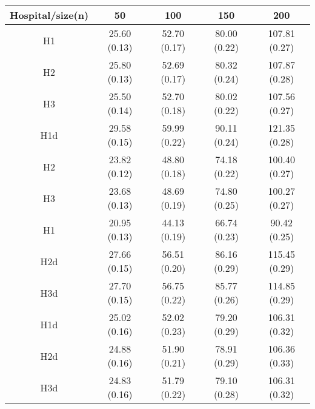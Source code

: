 \begin{center}
\begin{tabular}{c | c | c | c | c}
Hospital/size(n) & 50 & 100 & 150 & 200\\ \hline
H1 & 25.60 (0.13) & 52.70 (0.17) & 80.00 (0.22) & 107.81 (0.27) \\
H2 & 25.80 (0.13) & 52.69 (0.17) & 80.32 (0.24) & 107.87 (0.28) \\
H3 & 25.50 (0.14) & 52.70 (0.18) & 80.02 (0.22) & 107.56 (0.27) \\
H1d & 29.58 (0.15) & 59.99 (0.22) & 90.11 (0.24) & 121.35 (0.28) \\
H2 & 23.82 (0.12) & 48.80 (0.18) & 74.18 (0.22) & 100.40 (0.27) \\
H3 & 23.68 (0.13) & 48.69 (0.19) & 74.80 (0.25) & 100.27 (0.27) \\
H1 & 20.95 (0.13) & 44.13 (0.19) & 66.74 (0.23) & 90.42 (0.25) \\
H2d & 27.66 (0.15) & 56.51 (0.20) & 86.16 (0.29) & 115.45 (0.29) \\
H3d & 27.70 (0.15) & 56.75 (0.22) & 85.77 (0.26) & 114.85 (0.29) \\
H1d & 25.02 (0.16) & 52.02 (0.23) & 79.20 (0.29) & 106.31 (0.32) \\
H2d & 24.88 (0.16) & 51.90 (0.21) & 78.91 (0.29) & 106.36 (0.33) \\
H3d & 24.83 (0.16) & 51.79 (0.22) & 79.10 (0.28) & 106.31 (0.32) \\
\end{tabular}
\end{center}
